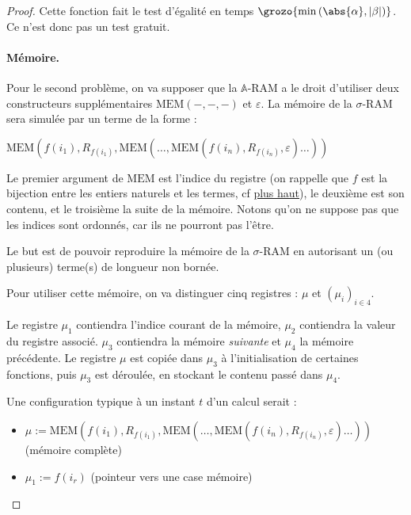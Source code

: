 \documentclass{report}
\newcommand{\bbA}{\mathbb{A}}
\begin{document}
\begin{proof}
					\espace
					
					Cette fonction fait le test d'égalité en temps $\grozo{\min\left(\abs{\alpha}, \left| \beta \right|\right)}$. Ce n'est donc pas un test gratuit. 
					
					
					\paragraph{Mémoire.}
					\label{par:A_RAM_memoire}
					Pour le second problème, on va supposer que la $\bbA$-RAM a le droit d'utiliser deux constructeurs supplémentaires $\text{MEM}(-,-,-)$ et $\varepsilon$. La mémoire de la $\sigma$-RAM sera simulée par un terme de la forme : 
					
					$\text{MEM}(f(i_1), R_{f(i_1)}, \text{MEM}( \dots, \text{MEM}(f(i_n), R_{f(i_n)}, \varepsilon) \dots ) )$
					
					Le premier argument de $\text{MEM}$ est l'indice du registre (on rappelle que $f$ est la bijection entre les entiers naturels et les termes, cf \hyperref[text:bijection_f]{plus haut}), le deuxième est son contenu, et le troisième la suite de la mémoire. Notons qu'on ne suppose pas que les indices sont ordonnés, car ils ne pourront pas l'être. 
					
					Le but est de pouvoir reproduire la mémoire de la $\sigma$-RAM en autorisant un (ou plusieurs) terme(s) de longueur non bornée. 
					
					Pour utiliser cette mémoire, on va distinguer cinq registres : $\mu$ et $\left( \mu_i \right)_{i \in 4}$.
					
					Le registre $\mu_1$ contiendra l'indice courant de la mémoire, $\mu_2$ contiendra la valeur du registre associé. $\mu_3$ contiendra la mémoire \emph{suivante} et $\mu_4$ la mémoire précédente. Le registre $\mu$ est copiée dans $\mu_3$ à l'initialisation de certaines fonctions, puis $\mu_3$ est déroulée, en stockant le contenu passé dans $\mu_4$. 
					
					Une configuration typique à un instant $t$ d'un calcul serait :

						
					\begin{itemize}
						\item 	
								$\mu := \text{MEM}(f(i_1), R_{f(i_1)}, \text{MEM}( \dots, \text{MEM}(f(i_n), R_{f(i_n)}, \varepsilon) \dots ) )$ (mémoire complète)
								
						\item 	
								$\mu_1 := f(i_r)$ (pointeur vers une case mémoire)
								

\end{itemize}
\end{proof}
\end{document}
